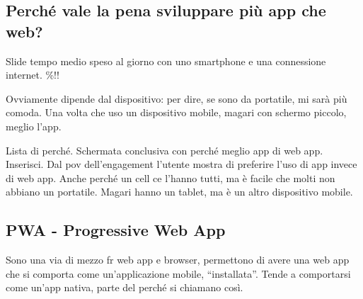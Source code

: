 \subsection{Perché vale la pena sviluppare più app che web?}
\par Slide tempo medio speso al giorno con uno smartphone e una connessione internet. \%!!
\par Ovviamente dipende dal dispositivo: per dire, se sono da portatile, mi sarà più comoda. Una volta che uso un dispositivo mobile, magari con schermo piccolo, meglio l'app.
\par Lista di perché.
Schermata conclusiva con perché meglio app di web app. Inserisci. Dal pov dell'engagement l'utente mostra di preferire l'uso di app invece di web app. Anche perché un cell ce l'hanno tutti, ma è facile che molti non abbiano un portatile. Magari hanno un tablet, ma è un altro dispositivo mobile.

\subsection{PWA - Progressive Web App}
\par Sono una via di mezzo fr web app e browser, permettono di avere una web app che si comporta come un'applicazione mobile, ``installata''. Tende a comportarsi come un'app nativa, parte del perché si chiamano così.
